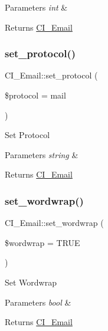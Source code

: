 \begin{DoxyParams}{Parameters}
{\em int} & \\
\hline
\end{DoxyParams}
\begin{DoxyReturn}{Returns}
\mbox{\hyperlink{class_c_i___email}{C\+I\+\_\+\+Email}} 
\end{DoxyReturn}
\mbox{\label{class_c_i___email_a747658786f90d1e9c16cab7e962407ad}} 
\subsubsection{\texorpdfstring{set\+\_\+protocol()}{set\_protocol()}}
{\footnotesize\ttfamily C\+I\+\_\+\+Email\+::set\+\_\+protocol (\begin{DoxyParamCaption}\item[{}]{\$protocol = {\ttfamily \textquotesingle{}mail\textquotesingle{}} }\end{DoxyParamCaption})}

Set Protocol


\begin{DoxyParams}{Parameters}
{\em string} & \\
\hline
\end{DoxyParams}
\begin{DoxyReturn}{Returns}
\mbox{\hyperlink{class_c_i___email}{C\+I\+\_\+\+Email}} 
\end{DoxyReturn}
\mbox{\label{class_c_i___email_a14b63cc85319c9ac0cccd7671904758b}} 
\subsubsection{\texorpdfstring{set\+\_\+wordwrap()}{set\_wordwrap()}}
{\footnotesize\ttfamily C\+I\+\_\+\+Email\+::set\+\_\+wordwrap (\begin{DoxyParamCaption}\item[{}]{\$wordwrap = {\ttfamily TRUE} }\end{DoxyParamCaption})}

Set Wordwrap


\begin{DoxyParams}{Parameters}
{\em bool} & \\
\hline
\end{DoxyParams}
\begin{DoxyReturn}{Returns}
\mbox{\hyperlink{class_c_i___email}{C\+I\+\_\+\+Email}} 
\end{DoxyReturn}
\mbox{\label{class_c_i___email_a97a496ca5086c4ff8e42453cb4df46f6}} 
